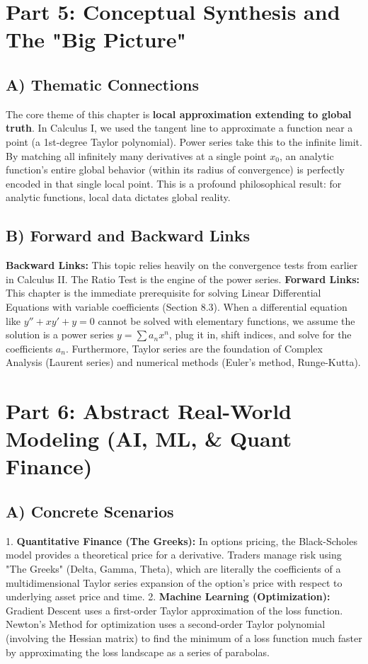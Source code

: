 \documentclass[11pt, letterpaper]{article}
\theoremstyle{definition}
\theoremstyle{remark}
\begin{document}
\newpage
\section{Part 5: Conceptual Synthesis and The "Big Picture"}

\subsection{A) Thematic Connections}
The core theme of this chapter is \textbf{local approximation extending to global truth}. In Calculus I, we used the tangent line to approximate a function near a point (a 1st-degree Taylor polynomial). Power series take this to the infinite limit. By matching all infinitely many derivatives at a single point $x_0$, an analytic function's entire global behavior (within its radius of convergence) is perfectly encoded in that single local point. This is a profound philosophical result: for analytic functions, local data dictates global reality.

\subsection{B) Forward and Backward Links}
\textbf{Backward Links:} This topic relies heavily on the convergence tests from earlier in Calculus II. The Ratio Test is the engine of the power series. 
\textbf{Forward Links:} This chapter is the immediate prerequisite for solving Linear Differential Equations with variable coefficients (Section 8.3). When a differential equation like $y'' + xy' + y = 0$ cannot be solved with elementary functions, we assume the solution is a power series $y = \sum a_n x^n$, plug it in, shift indices, and solve for the coefficients $a_n$. Furthermore, Taylor series are the foundation of Complex Analysis (Laurent series) and numerical methods (Euler's method, Runge-Kutta).

\section{Part 6: Abstract Real-World Modeling (AI, ML, \& Quant Finance)}

\subsection{A) Concrete Scenarios}
1. \textbf{Quantitative Finance (The Greeks):} In options pricing, the Black-Scholes model provides a theoretical price for a derivative. Traders manage risk using "The Greeks" (Delta, Gamma, Theta), which are literally the coefficients of a multidimensional Taylor series expansion of the option's price with respect to underlying asset price and time.
2. \textbf{Machine Learning (Optimization):} Gradient Descent uses a first-order Taylor approximation of the loss function. Newton's Method for optimization uses a second-order Taylor polynomial (involving the Hessian matrix) to find the minimum of a loss function much faster by approximating the loss landscape as a series of parabolas.
\end{document}
